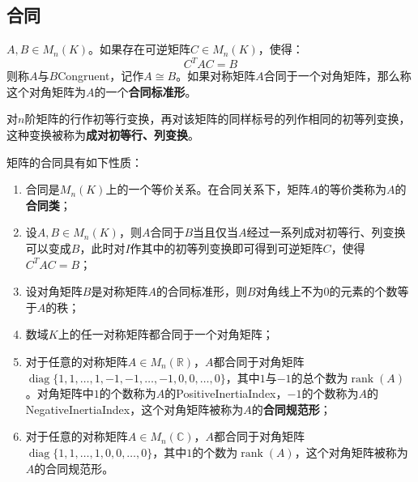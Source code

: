 \subsection{合同}
\begin{definition}
	$A,B\in M_{n}(K)$。如果存在可逆矩阵$C\in M_{n}(K)$，使得：
	\begin{equation*}
		C^TAC=B
	\end{equation*}
	则称$A$与$B$\gls{Congruent}，记作$A\cong B$。如果对称矩阵$A$合同于一个对角矩阵，那么称这个对角矩阵为$A$的一个\textbf{合同标准形}。
\end{definition}
\begin{definition}
	对$n$阶矩阵的行作初等行变换，再对该矩阵的同样标号的列作相同的初等列变换，这种变换被称为\textbf{成对初等行、列变换}。
\end{definition}
\begin{property}\label{prop:CongruentMatrix}
	矩阵的合同具有如下性质：
	\begin{enumerate}
		\item 合同是$M_{n}(K)$上的一个等价关系。在合同关系下，矩阵$A$的等价类称为$A$的\textbf{合同类}；
		\item 设$A,B\in M_{n}(K)$，则$A$合同于$B$当且仅当$A$经过一系列成对初等行、列变换可以变成$B$，此时对$I$作其中的初等列变换即可得到可逆矩阵$C$，使得$C^TAC=B$；
		\item 设对角矩阵$B$是对称矩阵$A$的合同标准形，则$B$对角线上不为$0$的元素的个数等于$A$的秩；
		\item 数域$K$上的任一对称矩阵都合同于一个对角矩阵；
		\item 对于任意的对称矩阵$A\in M_{n}(\mathbb{R})$，$A$都合同于对角矩阵\\$\operatorname{diag}\{1,1,\dots,1,-1,-1,\dots,-1,0,0,\dots,0\}$，其中$1$与$-1$的总个数为$\operatorname{rank}(A)$。对角矩阵中$1$的个数称为$A$的\gls{PositiveInertiaIndex}，$-1$的个数称为$A$的\gls{NegativeInertiaIndex}，这个对角矩阵被称为$A$的\textbf{合同规范形}；
		\item 对于任意的对称矩阵$A\in M_{n}(\mathbb{C})$，$A$都合同于对角矩阵$\operatorname{diag}\{1,1,\dots,1,0,0,\dots,0\}$，其中$1$的个数为$\operatorname{rank}(A)$，这个对角矩阵被称为$A$的合同规范形。
	\end{enumerate}
\end{property}
